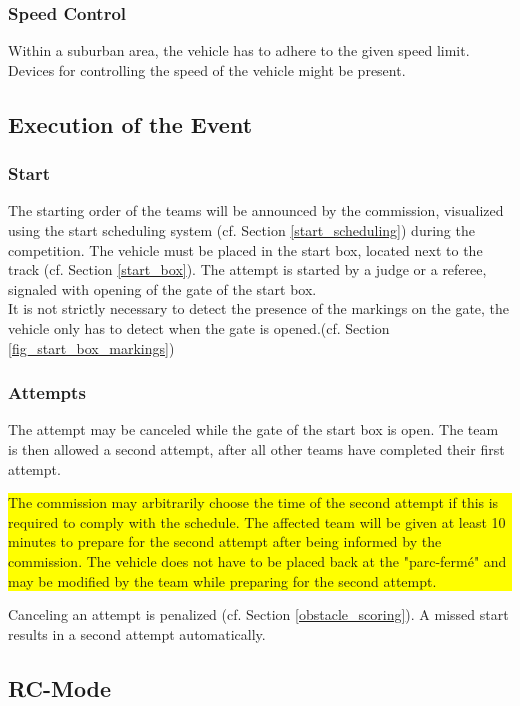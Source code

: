 \subsubsection{Speed Control}

Within a suburban area, the vehicle has to adhere to the given speed limit.
Devices for controlling the speed of the vehicle might be present.

\subsection{Execution of the Event}

\subsubsection{Start}

The starting order of the teams will be announced by the commission, visualized
using the start scheduling system (cf. Section \ref{start_scheduling}) during
the competition. The vehicle must be placed in the start box, located next to
the track (cf. Section \ref{start_box}). The attempt is started by a judge or a
referee, signaled with opening of the gate of the start box.\\ It is not
strictly necessary to detect the presence of the markings on the gate, the
vehicle only has to detect when the gate is opened.(cf. Section
\ref{fig_start_box_markings})

\subsubsection{Attempts}

The attempt may be canceled while the gate of the start box is open. The team
is then allowed a second attempt, after all other teams have completed their
first attempt.\\\colorbox{yellow}{\parbox{\colorboxwidth}{The commission may
		arbitrarily choose the time of the second attempt if this is required to comply
		with the schedule. The affected team will be given at least 10 minutes to
		prepare for the second attempt after being informed by the commission. The
		vehicle does not have to be placed back at the "parc-fermé" and may be modified
		by the team while preparing for the second attempt.}} Canceling an attempt is
penalized (cf. Section \ref{obstacle_scoring}). A missed start results in a
second attempt automatically.

\subsection{RC-Mode}


